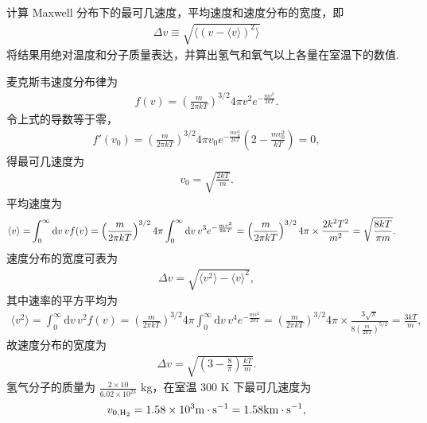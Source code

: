 \documentclass{assignment}
\begin{document}
\begin{prob}
    计算 Maxwell 分布下的最可几速度，平均速度和速度分布的宽度，即
    \begin{align}
        \Delta v\equiv\sqrt{\langle(v-\langle v\rangle)^2\rangle}
    \end{align}
    将结果用绝对温度和分子质量表达，并算出氢气和氧气以上各量在室温下的数值.
\end{prob}
\begin{sol}
    麦克斯韦速度分布律为
    \begin{align}
        f(v)=\left(\frac{m}{2\pi kT}\right)^{3/2}4\pi v^2e^{-\frac{mv^2}{2kT}}.
    \end{align}
    令上式的导数等于零，
    \begin{align}
        f'(v_0)=\left(\frac{m}{2\pi kT}\right)^{3/2}4\pi v_0e^{-\frac{mv_0^2}{2kT}}\left(2-\frac{mv_0^2}{kT}\right)=0,
    \end{align}
    得最可几速度为
    \begin{align}
        v_0=\sqrt{\frac{2kT}{m}}.
    \end{align}
    平均速度为
    \begin{align}
        \notag\langle v\rangle=&\int_0^{\infty}\mathrm{d}v\,vf(v)=\left(\frac{m}{2\pi kT}\right)^{3/2}4\pi\int_0^{\infty}\mathrm{d}v\,v^3e^{-\frac{mv^2}{2kT}}=\left(\frac{m}{2\pi kT}\right)^{3/2}4\pi\times\frac{2k^2T^2}{m^2}=\sqrt{\frac{8kT}{\pi m}}.
    \end{align}
    速度分布的宽度可表为
    \begin{align}
        \Delta v=\sqrt{\langle v^2\rangle-\langle v\rangle^2},
    \end{align}
    其中速率的平方平均为
    \begin{align}
        \langle v^2\rangle=\int_0^{\infty}\mathrm{d}v\,v^2f(v)=\left(\frac{m}{2\pi kT}\right)^{3/2}4\pi\int_0^{\infty}\mathrm{d}v\,v^4e^{-\frac{mv^2}{2kT}}=\left(\frac{m}{2\pi kT}\right)^{3/2}4\pi\times\frac{3\sqrt{\pi}}{8\left(\frac{m}{2kT}\right)^{5/2}}=\frac{3kT}{m},
    \end{align}
    故速度分布的宽度为
    \begin{align}
        \Delta v=\sqrt{\left(3-\frac{8}{\pi}\right)\frac{kT}{m}}.
    \end{align}
    氢气分子的质量为 $\frac{2\times 10}{6.02\times 10^{23}}$ kg，在室温 $300$ K 下最可几速度为
    \begin{align}
        v_{0,\ce{H2}}=1.58\times 10^3\text{m}\cdot\text{s}^{-1}=1.58\text{km}\cdot\text{s}^{-1},
    \end{align}

\end{sol}
\end{document}

